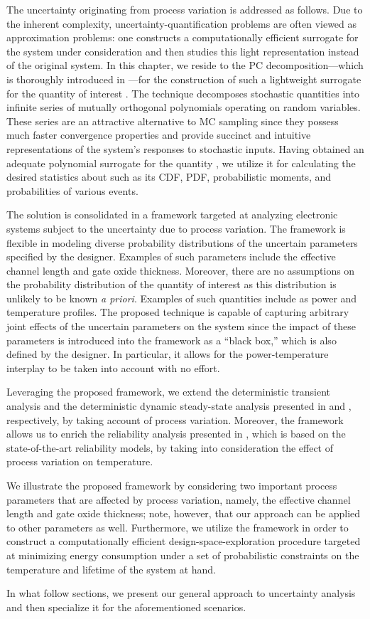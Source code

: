 The uncertainty originating from process variation is addressed as follows. Due
to the inherent complexity, uncertainty-quantification problems are often viewed
as approximation problems: one constructs a computationally efficient surrogate
for the system under consideration and then studies this light representation
instead of the original system. In this chapter, we reside to the \ac{PC}
decomposition---which is thoroughly introduced in ---for
the construction of such a lightweight surrogate for the quantity of interest
\g. The technique decomposes stochastic quantities into infinite series of
mutually orthogonal polynomials operating on random variables. These series are
an attractive alternative to \ac{MC} sampling since they possess much faster
convergence properties and provide succinct and intuitive representations of the
system's responses to stochastic inputs. Having obtained an adequate polynomial
surrogate for the quantity \g, we utilize it for calculating the desired
statistics about \g such as its \ac{CDF}, \ac{PDF}, probabilistic moments, and
probabilities of various events.

The solution is consolidated in a framework targeted at analyzing electronic
systems subject to the uncertainty due to process variation. The framework is
flexible in modeling diverse probability distributions of the uncertain
parameters specified by the designer. Examples of such parameters include the
effective channel length and gate oxide thickness. Moreover, there are no
assumptions on the probability distribution of the quantity of interest as this
distribution is unlikely to be known \emph{a priori}. Examples of such
quantities include as power and temperature profiles. The proposed technique is
capable of capturing arbitrary joint effects of the uncertain parameters on the
system since the impact of these parameters is introduced into the framework as
a ``black box,'' which is also defined by the designer. In particular, it allows
for the power-temperature interplay to be taken into account with no effort.

Leveraging the proposed framework, we extend the deterministic transient
analysis and the deterministic dynamic steady-state analysis presented in
 and ,
respectively, by taking account of process variation. Moreover, the framework
allows us to enrich the reliability analysis presented in
, which is based on the state-of-the-art reliability
models, by taking into consideration the effect of process variation on
temperature.

We illustrate the proposed framework by considering two important process
parameters that are affected by process variation, namely, the effective channel
length and gate oxide thickness; note, however, that our approach can be applied
to other parameters as well. Furthermore, we utilize the framework in order to
construct a computationally efficient design-space-exploration procedure
targeted at minimizing energy consumption under a set of probabilistic
constraints on the temperature and lifetime of the system at hand.

In what follow sections, we present our general approach to uncertainty analysis
and then specialize it for the aforementioned scenarios.

